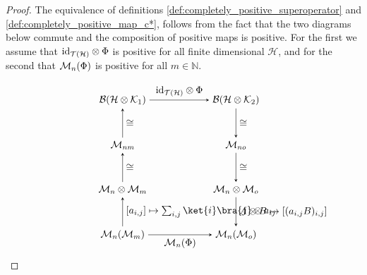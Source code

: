 \begin{proof}
The equivalence of definitions \ref{def:completely_positive_superoperator} and \ref{def:completely_positive_map_c*}, follows from the fact that the two diagrams below commute and the composition of positive maps is positive. For the first we assume that $\mathrm{id}_{\mathcal{T}(\mathcal{H})} \otimes \Phi$ is positive for all finite dimensional $\mathcal{H}$, and for the second that $\mathcal{M}_{n}(\Phi)$ is positive for all $m \in \mathbb{N}$. 


\[
\hspace{-30pt}
\begin{minipage}{0.45\textwidth}
\centering
\begin{tikzpicture}
  \matrix (m) [matrix of math nodes,row sep=3em,column sep=6em,minimum width=1em]
  {
  \BoundOp{\HilbH \otimes \HilbK_1} & \BoundOp{\HilbH \otimes \HilbK_2} \\
  \SqMatrix{nm} & \SqMatrix{no}   \\
  \SqMatrix{n} \otimes  \SqMatrix{m} &  \SqMatrix{n} \otimes  \SqMatrix{o}  \\
  \SqMatrix{n}( \SqMatrix{m}) &  \SqMatrix{n}( \SqMatrix{o}) \\
  };
  \path[-stealth]
    (m-1-1) edge  node [above] {$\id_{\mathcal{T}(\HilbH)} \otimes \Phi  $} (m-1-2)
    (m-2-2) edge   node [right] {$\cong $} (m-3-2)
    (m-1-2) edge   node [right] {$\cong $} (m-2-2)
    (m-3-2) edge  node [right] {$ A \otimes B \mapsto [(a_{i,j} B)_{i,j}] $} (m-4-2)
    (m-3-1) edge  node [right] {$ \cong $} (m-2-1)
    (m-2-1) edge  node [right] {$ \cong $} (m-1-1)
    (m-4-1) edge  node [right] {$[a_{i,j}] \mapsto \sum_{i,j}  \ket{i}\bra{j} \otimes a_{ij} $} (m-3-1)
    (m-4-1) edge  node [below] {$\SqMatrix{n}(\Phi)$} (m-4-2)
    ;
\end{tikzpicture}
\end{minipage}
\]


\end{proof}
